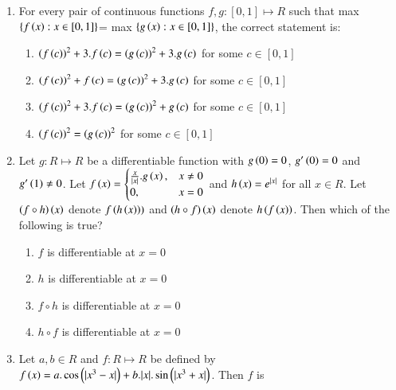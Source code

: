 \documentclass[journal,12pt,twocolumn]{IEEEtran}
\theoremstyle{remark}
\begin{document}
\begin{enumerate}
    \item 
    {For every pair of continuous functions $f, g: [0, 1]\mapsto R$ such that max $\{f\left(x\right): x\in [0, 1]\}$= max $\{g\left(x\right): x\in [0, 1]\}$, the correct statement is:}
   
    \hfill 
    {}
    
    \begin{enumerate}[label=(\alph*)]
        
        \item ${\left(f\left(c\right)\right)}^2+3.f\left(c\right)={\left(g\left(c\right)\right)}^2+3.g\left(c\right)$ for some $c\in [0,1]$
        \item ${\left(f\left(c\right)\right)}^2+f\left(c\right)={\left(g\left(c\right)\right)}^2+3.g\left(c\right)$ for some $c\in [0,1]$
        \item ${\left(f\left(c\right)\right)}^2+3.f\left(c\right)={\left(g\left(c\right)\right)}^2+g\left(c\right)$ for some $c\in [0,1]$
        \item ${\left(f\left(c\right)\right)}^2={\left(g\left(c\right)\right)}^2$ for some $c\in [0,1]$ 
    \end{enumerate}


    \item 
    {Let $g: R\mapsto R$ be a differentiable function with $g\left(0\right)=0$, $g'\left(0\right)=0$ and $g'\left(1\right)\neq 0$. Let $f\left(x\right)=
        \begin{cases}
            \frac{x}{|x|}.g\left(x\right), & x\neq 0 \\
            0, & x=0
        \end{cases}$ 
        and $h\left(x\right)=e^{|x|}$ for all $x\in R$. Let $\left(f\circ h\right)\left(x\right)$ denote $f\left(h\left(x\right)\right))$ and $\left(h\circ f\right)\left(x\right)$ denote $h\left(f\left(x\right)\right)$. Then which of the following is true?}
        
    \hfill 
    {}
    
    \begin{enumerate}[label=(\alph*)]
        
        \item $f$ is differentiable at $x=0$ 
        \item $h$ is differentiable at $x=0$ 
        \item $f\circ h$ is differentiable at $x=0$ 
        \item $h\circ f$ is differentiable at $x=0$  
    \end{enumerate}


    \item 
    {Let $a, b\in R$ and $f: R\mapsto R$ be defined by $f\left(x\right)=a.\cos \left(|x^3-x|\right) +b.|x|.\sin \left(|x^3+x|\right)$. Then $f$ is}   
        

\end{enumerate}
\end{document}
